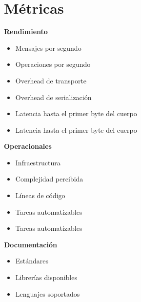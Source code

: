 \section{Métricas} %
\label{sec:métricas}

\textbf{Rendimiento}

\begin{itemize}
  \item Mensajes por segundo
  \item Operaciones por segundo
  \item Overhead de transporte
  \item Overhead de serialización
  \item Latencia hasta el primer byte del cuerpo
  \item Latencia hasta el primer byte del cuerpo
\end{itemize}

\textbf{Operacionales}
\begin{itemize}
  \item Infraestructura
  \item Complejidad percibida
  \item Líneas de código
  \item Tareas automatizables
  \item Tareas automatizables
\end{itemize}

\textbf{Documentación}
\begin{itemize}
  \item Estándares
  \item Librerías disponibles
  \item Lenguajes soportados
\end{itemize}